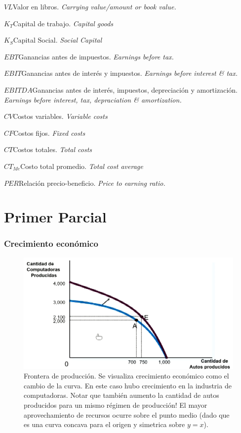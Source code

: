 \documentclass[twocolumn,10pt]{article}
\newcommand{\glossml}[3]{$#1$\indent #2 \emph{#3}  \par \vspace{.4cm} } %
\begin{document}
\glossml{VL}{Valor en libros.}{Carrying value/amount or book value.}
\glossml{K_T}{Capital de trabajo.}{Capital goods}
\glossml{K_S}{Capital Social.}{Social Capital}

\glossml{EBT}{Ganancias antes de impuestos.}{Earnings before tax.}
\glossml{EBIT}{Ganancias antes de interés y impuestos.}{Earnings before interest \& tax.}
\glossml{EBITDA}{Ganancias antes de interés, impuestos, depreciación y amortización.}{Earnings before interest, tax, depraciation \& amortization.}
\glossml{CV}{Costos variables.}{Variable costs}
\glossml{CF}{Costos fijos.}{Fixed costs}
\glossml{CT}{Costos totales.}{Total costs}
\glossml{CT_{Me}}{Costo total promedio.}{Total cost average}

\glossml{PER}{Relación precio-beneficio.}{Price to earning ratio.}


\newcommand{\fiN}{\ensuremath{f_i^N}}

\tableofcontents

\newpage
\part{Primer Parcial}
\section{Crecimiento económico}
\begin{figure}[htb!]
	\centering
	\includegraphics[width=1\linewidth]{fig/frontProd}
	\caption{Frontera de producción. Se visualiza crecimiento econ\'omico como el cambio de la curva. En este caso hubo crecimiento en la industria de computadoras. Notar que tambi\'en aumento la cantidad de autos producidos para un mismo r\'egimen de producci\'on! El mayor aprovechamiento de recursos ocurre sobre el punto medio (dado que es una curva concava para el origen y simetrica sobre $y=x$).}
	\label{fig:frontprod}
\end{figure}
\end{document}
